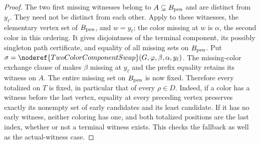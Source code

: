 \begin{proof}
The two first missing witnesses belong to $A\subseteq B_{\rm pen}$
and are distinct from $y_\ell$. They need not be distinct from each
other. Apply  to these
witnesses, the elementary vertex set of $B_{\rm pen}$, and $w=y_\ell$;
the color missing at $w$ is $\alpha$, the second color in this ordering.
It gives disjointness of the terminal component, its possibly singleton
path certificate, and equality of all missing sets on $B_{\rm pen}$.
Put $\sigma=\noderef{TwoColorComponentSwap}(G,\varphi,\beta,\alpha,y_\ell)$.
The missing-color exchange clause of
 makes $\beta$ missing
at $y_\ell$ and the prefix equality retains its witness on $A$.
The entire missing set on $B_{\rm pen}$ is now fixed. Therefore every
totalized  on $T$ is fixed,
in particular that of every $\rho\in D$. Indeed, if a color has a
witness before the last vertex, equality at every preceding vertex
preserves exactly its nonempty set of early candidates and its least
candidate. If it has no early witness, neither coloring has one,
and both totalized positions are the last index, whether or not a
terminal witness exists. This checks the fallback as well as the
actual-witness case.


\end{proof}
